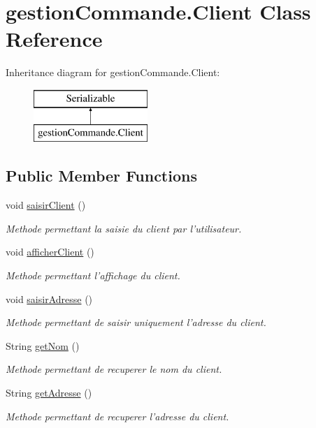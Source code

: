 \hypertarget{classgestion_commande_1_1_client}{\section{gestion\-Commande.\-Client Class Reference}
\label{classgestion_commande_1_1_client}
}
Inheritance diagram for gestion\-Commande.\-Client\-:\begin{figure}[H]
\begin{center}
\leavevmode
\includegraphics[height=2.000000cm]{classgestion_commande_1_1_client}
\end{center}
\end{figure}
\subsection*{Public Member Functions}
\begin{DoxyCompactItemize}
\item 
void \hyperlink{classgestion_commande_1_1_client_a4321a476e46367fb05288dd404681d18}{saisir\-Client} ()
\begin{DoxyCompactList}\small\item\em Methode permettant la saisie du client par l'utilisateur. \end{DoxyCompactList}\item 
void \hyperlink{classgestion_commande_1_1_client_a53a0a0f32d6749b1e024d25358df95c2}{afficher\-Client} ()
\begin{DoxyCompactList}\small\item\em Methode permettant l'affichage du client. \end{DoxyCompactList}\item 
void \hyperlink{classgestion_commande_1_1_client_aae19e5e1047008ebc311a60f8bba12ef}{saisir\-Adresse} ()
\begin{DoxyCompactList}\small\item\em Methode permettant de saisir uniquement l'adresse du client. \end{DoxyCompactList}\item 
String \hyperlink{classgestion_commande_1_1_client_a571b28e84f725329bb1f1d3eaee45559}{get\-Nom} ()
\begin{DoxyCompactList}\small\item\em Methode permettant de recuperer le nom du client. \end{DoxyCompactList}\item 
String \hyperlink{classgestion_commande_1_1_client_a3d39bb4646c3127d1e1442a1d5d509b7}{get\-Adresse} ()
\begin{DoxyCompactList}\small\item\em Methode permettant de recuperer l'adresse du client. \end{DoxyCompactList}\end{DoxyCompactItemize}
